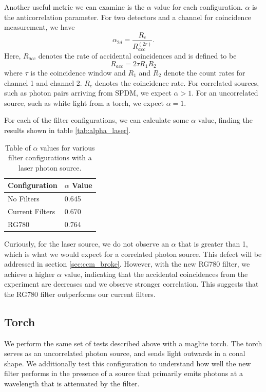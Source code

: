 \documentclass[letterpaper, 11 pt]{article}
\begin{document}
Another useful metric we can examine is the $\alpha$ value for each configuration.
$\alpha$ is the anticorrelation parameter. For two detectors and a channel for coincidence measurement,
we have
\begin{equation}
    \alpha_{2d} = \frac{R_c}{R^{(2r)}_{acc}}.
\end{equation}
Here, $R_{acc}$ denotes the rate of accidental coincidences and is defined to be
\begin{equation}
    R_{acc} = 2\tau R_1 R_2
\end{equation}
where $\tau$ is the coincidence window and $R_1$ and $R_2$ denote the count rates
for channel 1 and channel 2. $R_c$ denotes the coincidence rate. For correlated sources, such as photon pairs arriving from SPDM, we expect $\alpha > 1$.
For an uncorrelated source, such as white light from a torch, we expect $\alpha = 1$.

For each of the filter configurations, we can calculate some $\alpha$ value, finding the
results shown in table \ref{tab:alpha_laser}.
\begin{table}[H]
    \centering
    \begin{tabular}{|l|l|}
    \hline
    \textbf{Configuration} & \textbf{$\alpha$ Value} \\ \hline
    No Filters             & 0.645                   \\ \hline
    Current Filters        & 0.670                   \\ \hline
    RG780                  & 0.764                   \\ \hline
    \end{tabular}
    \caption{Table of $\alpha$ values for various filter configurations with a laser photon source.}
\end{table}\label{tab:alpha_laser}
Curiously, for the laser source, we do not observe an $\alpha$ that is greater than 1, which is
what we would expect for a correlated photon source. This defect will be addressed in section \ref{sec:ccm_broke}.
However, with the new RG780 filter, we achieve a higher $\alpha$ value, indicating that the accidental coincidences
from the experiment are decreases and we observe stronger correlation. This suggests that the RG780 filter outperforms
our current filters.

\subsection{Torch}
We perform the same set of tests described above with a maglite torch. The torch serves
as an uncorrelated photon source, and sends light outwards in a conal shape. We additionally test
this configuration to understand how well the new filter performs in the presence of a source
that primarily emits photons at a wavelength that is attenuated by the filter.
\end{document}
